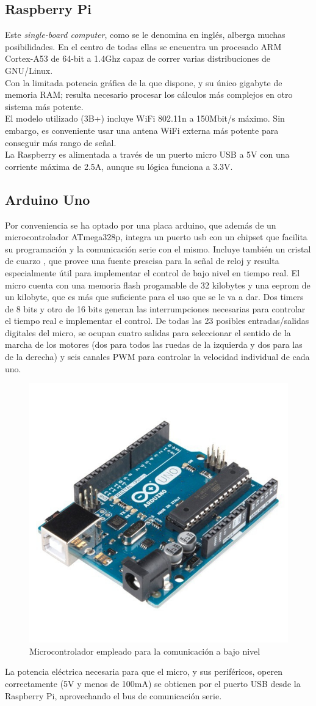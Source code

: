 \subsection{Raspberry Pi}
Este \textit{single-board computer}, como se le denomina en inglés, alberga muchas posibilidades. En el centro de todas ellas se encuentra un procesado ARM Cortex-A53 de 64-bit a 1.4Ghz capaz de correr varias distribuciones de GNU/Linux. \\
Con la limitada potencia gráfica de la que dispone, y su único gigabyte de memoria RAM; resulta necesario procesar los cálculos más complejos en otro sistema más potente.\\
El modelo utilizado (3B+) incluye WiFi 802.11n a 150Mbit/s máximo. Sin embargo, es conveniente usar una antena WiFi externa más potente para conseguir más rango de señal.\\
La Raspberry es alimentada a través de un puerto micro USB a 5V con una corriente máxima de 2.5A, aunque su lógica funciona a 3.3V.

\subsection{Arduino Uno}
Por conveniencia se ha optado por una placa arduino, que además de un microcontrolador ATmega328p, integra un puerto usb con un chipset que facilita su programación y la comunicación serie con el mismo. Incluye también un cristal de cuarzo , que provee una fuente prescisa para la señal de reloj y resulta especialmente útil para implementar el control de bajo nivel en tiempo real.
El micro cuenta con una memoria flash progamable de 32 kilobytes y una eeprom de un kilobyte, que es más que suficiente para el uso que se le va a dar. Dos timers de 8 bits y otro de 16 bits generan las interrumpciones necesarias para controlar el tiempo real e implementar el control. De todas las 23 posibles entradas/salidas digitales del micro, se ocupan cuatro salidas para seleccionar el sentido de la marcha de los motores (dos para todos las ruedas de la izquierda y dos para las de la derecha) y seis canales PWM para controlar la velocidad individual de cada uno.\\
\newpage
\begin{figure}[h!]
	\centering
	\includegraphics[width=.3\textwidth]{images/hw/arduino}
	\caption{Microcontrolador empleado para la comunicación a bajo nivel}
\end{figure}
\par
La potencia eléctrica necesaria para que el micro, y sus periféricos, operen correctamente (5V y menos de 100mA) se obtienen por el puerto USB desde la Raspberry Pi, aprovechando el bus de comunicación serie.


